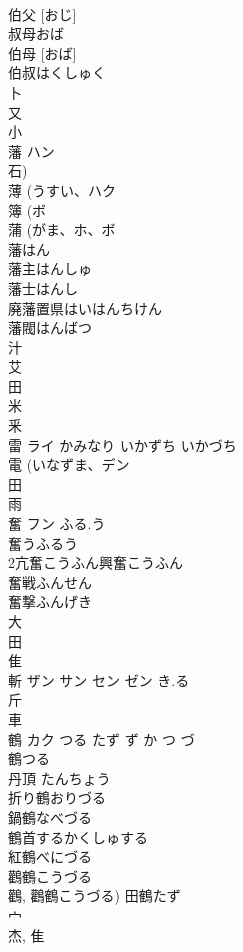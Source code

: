 \documentclass[8pt]{extreport}
\begin{document}
\begin{CJK}{UTF8}{min}
\\	伯父 [おじ] 
\\	叔母おば
\\	伯母 [おば] 
\\	伯叔はくしゅく
\\	卜 
\\	又 
\\	小 
\\	藩	ハン		
\\	石) 
\\	薄 (うすい、ハク 
\\	簿 (ボ 
\\	蒲 (がま、ホ、ボ 
\\	藩はん 
\\	藩主はんしゅ 
\\	藩士はんし 
\\	廃藩置県はいはんちけん 
\\	藩閥はんばつ 
\\	汁 
\\	艾 
\\	田 
\\	米 
\\	釆 
\\	雷	ライ	かみなり いかずち いかづち	
\\	電 (いなずま、デン 
\\	田 
\\	雨 
\\	奮	フン	ふる.う	
\\	奮うふるう
\\	2亢奮こうふん興奮こうふん
\\	奮戦ふんせん
\\	奮撃ふんげき
\\	大 
\\	田 
\\	隹 
\\	斬	ザン サン セン ゼン	き.る	
\\	斤 
\\	車 
\\	鶴	カク	つる たず ず か つ づ	
\\	鶴つる 
\\	丹頂 たんちょう 
\\	折り鶴おりづる 
\\	鍋鶴なべづる 
\\	鶴首するかくしゅする 
\\	紅鶴べにづる 
\\	鸛鶴こうづる 
\\	鸛, 鸛鶴こうづる) 田鶴たず 
\\	宀 
\\	杰, 隹 

\end{CJK}
\end{document}
